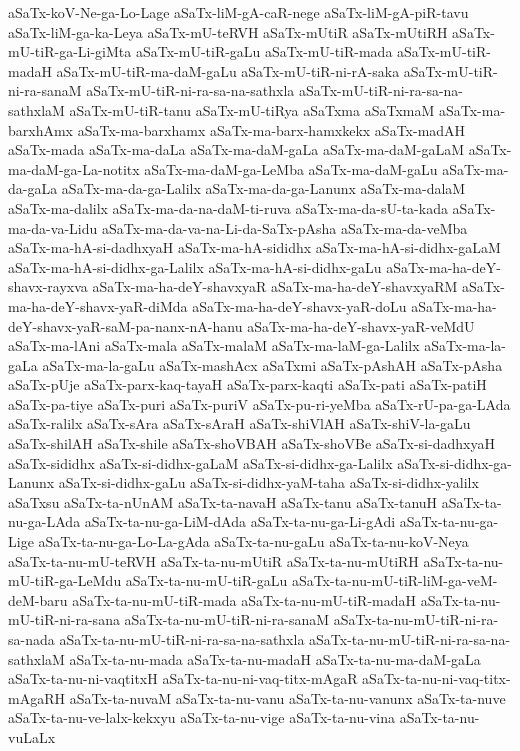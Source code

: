 {aSaTx-koV-Ne-ga-Lo-Lage
aSaTx-liM-gA-caR-nege
aSaTx-liM-gA-piR-tavu
aSaTx-liM-ga-ka-Leya
aSaTx-mU-teRVH
aSaTx-mUtiR
aSaTx-mUtiRH
aSaTx-mU-tiR-ga-Li-giMta
aSaTx-mU-tiR-gaLu
aSaTx-mU-tiR-mada
aSaTx-mU-tiR-madaH
aSaTx-mU-tiR-ma-daM-gaLu
aSaTx-mU-tiR-ni-rA-saka
aSaTx-mU-tiR-ni-ra-sanaM
aSaTx-mU-tiR-ni-ra-sa-na-sathxla
aSaTx-mU-tiR-ni-ra-sa-na-sathxlaM
aSaTx-mU-tiR-tanu
aSaTx-mU-tiRya
aSaTxma
aSaTxmaM
aSaTx-ma-barxhAmx
aSaTx-ma-barxhamx
aSaTx-ma-barx-hamxkekx
aSaTx-madAH
aSaTx-mada
aSaTx-ma-daLa
aSaTx-ma-daM-gaLa
aSaTx-ma-daM-gaLaM
aSaTx-ma-daM-ga-La-notitx
aSaTx-ma-daM-ga-LeMba
aSaTx-ma-daM-gaLu
aSaTx-ma-da-gaLa
aSaTx-ma-da-ga-Lalilx
aSaTx-ma-da-ga-Lanunx
aSaTx-ma-dalaM
aSaTx-ma-dalilx
aSaTx-ma-da-na-daM-ti-ruva
aSaTx-ma-da-sU-ta-kada
aSaTx-ma-da-va-Lidu
aSaTx-ma-da-va-na-Li-da-SaTx-pAsha
aSaTx-ma-da-veMba
aSaTx-ma-hA-si-dadhxyaH
aSaTx-ma-hA-sididhx
aSaTx-ma-hA-si-didhx-gaLaM
aSaTx-ma-hA-si-didhx-ga-Lalilx
aSaTx-ma-hA-si-didhx-gaLu
aSaTx-ma-ha-deY-shavx-rayxva
aSaTx-ma-ha-deY-shavxyaR
aSaTx-ma-ha-deY-shavxyaRM
aSaTx-ma-ha-deY-shavx-yaR-diMda
aSaTx-ma-ha-deY-shavx-yaR-doLu
aSaTx-ma-ha-deY-shavx-yaR-saM-pa-nanx-nA-hanu
aSaTx-ma-ha-deY-shavx-yaR-veMdU
aSaTx-ma-lAni
aSaTx-mala
aSaTx-malaM
aSaTx-ma-laM-ga-Lalilx
aSaTx-ma-la-gaLa
aSaTx-ma-la-gaLu
aSaTx-mashAcx
aSaTxmi
aSaTx-pAshAH
aSaTx-pAsha
aSaTx-pUje
aSaTx-parx-kaq-tayaH
aSaTx-parx-kaqti
aSaTx-pati
aSaTx-patiH
aSaTx-pa-tiye
aSaTx-puri
aSaTx-puriV
aSaTx-pu-ri-yeMba
aSaTx-rU-pa-ga-LAda
aSaTx-ralilx
aSaTx-sAra
aSaTx-sAraH
aSaTx-shiVlAH
aSaTx-shiV-la-gaLu
aSaTx-shilAH
aSaTx-shile
aSaTx-shoVBAH
aSaTx-shoVBe
aSaTx-si-dadhxyaH
aSaTx-sididhx
aSaTx-si-didhx-gaLaM
aSaTx-si-didhx-ga-Lalilx
aSaTx-si-didhx-ga-Lanunx
aSaTx-si-didhx-gaLu
aSaTx-si-didhx-yaM-taha
aSaTx-si-didhx-yalilx
aSaTxsu
aSaTx-ta-nUnAM
aSaTx-ta-navaH
aSaTx-tanu
aSaTx-tanuH
aSaTx-ta-nu-ga-LAda
aSaTx-ta-nu-ga-LiM-dAda
aSaTx-ta-nu-ga-Li-gAdi
aSaTx-ta-nu-ga-Lige
aSaTx-ta-nu-ga-Lo-La-gAda
aSaTx-ta-nu-gaLu
aSaTx-ta-nu-koV-Neya
aSaTx-ta-nu-mU-teRVH
aSaTx-ta-nu-mUtiR
aSaTx-ta-nu-mUtiRH
aSaTx-ta-nu-mU-tiR-ga-LeMdu
aSaTx-ta-nu-mU-tiR-gaLu
aSaTx-ta-nu-mU-tiR-liM-ga-veM-deM-baru
aSaTx-ta-nu-mU-tiR-mada
aSaTx-ta-nu-mU-tiR-madaH
aSaTx-ta-nu-mU-tiR-ni-ra-sana
aSaTx-ta-nu-mU-tiR-ni-ra-sanaM
aSaTx-ta-nu-mU-tiR-ni-ra-sa-nada
aSaTx-ta-nu-mU-tiR-ni-ra-sa-na-sathxla
aSaTx-ta-nu-mU-tiR-ni-ra-sa-na-sathxlaM
aSaTx-ta-nu-mada
aSaTx-ta-nu-madaH
aSaTx-ta-nu-ma-daM-gaLa
aSaTx-ta-nu-ni-vaqtitxH
aSaTx-ta-nu-ni-vaq-titx-mAgaR
aSaTx-ta-nu-ni-vaq-titx-mAgaRH
aSaTx-ta-nuvaM
aSaTx-ta-nu-vanu
aSaTx-ta-nu-vanunx
aSaTx-ta-nuve
aSaTx-ta-nu-ve-lalx-kekxyu
aSaTx-ta-nu-vige
aSaTx-ta-nu-vina
aSaTx-ta-nu-vuLaLx
}
